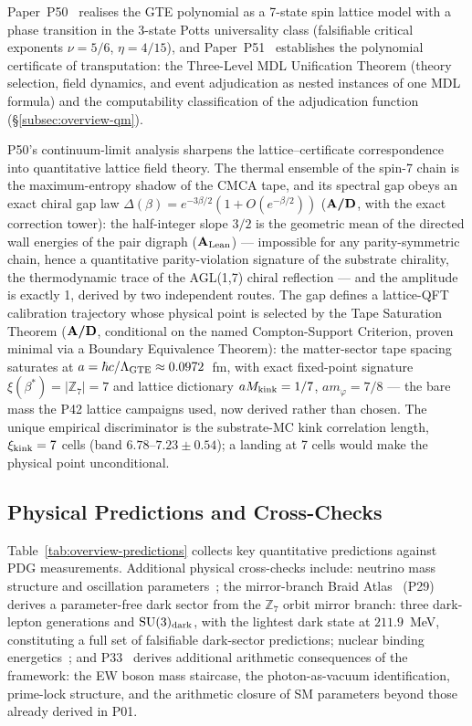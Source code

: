 Paper~P50~\cite{SpivackSpin7Lattice} realises the GTE polynomial as a 7-state
spin lattice model with a phase transition in the 3-state Potts universality
class (falsifiable critical exponents $\nu = 5/6$, $\eta = 4/15$), and
Paper~P51~\cite{SpivackPolynomialTransputation} establishes the polynomial
certificate of transputation: the Three-Level MDL Unification Theorem (theory
selection, field dynamics, and event adjudication as nested instances of one
MDL formula) and the computability classification of the adjudication function
(\S\ref{subsec:overview-qm}).

P50's continuum-limit analysis sharpens the lattice--certificate correspondence
into quantitative lattice field theory.  The thermal ensemble of the spin-7
chain is the maximum-entropy shadow of the CMCA tape, and its spectral gap
obeys an exact chiral gap law $\Delta(\beta) = e^{-3\beta/2}(1 + O(e^{-\beta/2}))$
($\textbf{A/D}$, with the exact correction tower): the half-integer slope $3/2$ is the
geometric mean of the directed wall energies of the pair digraph ($\textbf{A}_{\rm Lean}$) ---
impossible for any parity-symmetric chain, hence a quantitative
parity-violation signature of the substrate chirality, the thermodynamic trace
of the AGL(1,7) chiral reflection --- and the amplitude is exactly 1, derived
by two independent routes.  The gap defines a lattice-QFT calibration
trajectory whose physical point is selected by the Tape Saturation Theorem
($\textbf{A/D}$, conditional on the named Compton-Support Criterion, proven minimal
via a Boundary Equivalence Theorem): the matter-sector tape spacing saturates
at $a = \hbar c/\Lambda_{\rm GTE} \approx 0.0972$~fm, with exact fixed-point
signature $\xi(\beta^*) = |\mathbb{Z}_7| = 7$ and lattice dictionary
$aM_{\rm kink} = 1/7$, $am_\varphi = 7/8$ --- the bare mass the P42 lattice
campaigns used, now derived rather than chosen.  The unique empirical
discriminator is the substrate-MC kink correlation length, $\xi_{\rm kink} = 7$
cells (band $6.78$--$7.23 \pm 0.54$); a landing at 7 cells would make the
physical point unconditional.

\subsection{Physical Predictions and Cross-Checks}
\label{subsec:overview-predictions}

Table~\ref{tab:overview-predictions} collects key quantitative predictions
against PDG measurements.  Additional physical cross-checks include: neutrino mass
structure and oscillation parameters~\cite{SpivackNeutrino};
the mirror-branch Braid Atlas~\cite{SpivackMirrorBraidAtlas} (P29) derives a parameter-free
dark sector from the $\mathbb{Z}_7$ orbit mirror branch: three dark-lepton generations and
$\mathrm{SU}(3)_{\rm dark}$, with the lightest dark state at $211.9$~MeV, constituting
a full set of falsifiable dark-sector predictions;
nuclear binding
energetics~\cite{SpivackSM}; and P33~\cite{SpivackDeeperConsequences} derives additional arithmetic consequences
of the framework: the EW boson mass staircase, the photon-as-vacuum identification,
prime-lock structure, and the arithmetic closure of SM parameters beyond those already
derived in P01.

